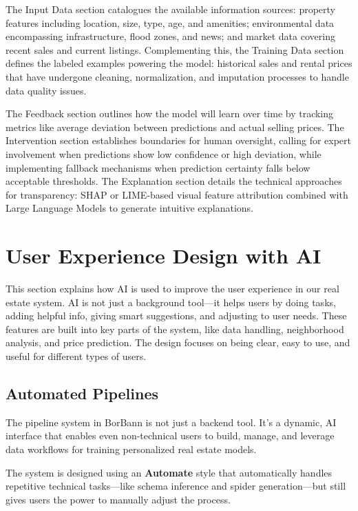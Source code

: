 The Input Data section catalogues the available information sources: property features including location, size, type, age, and amenities; environmental data encompassing infrastructure, flood zones, and news; and market data covering recent sales and current listings. Complementing this, the Training Data section defines the labeled examples powering the model: historical sales and rental prices that have undergone cleaning, normalization, and imputation processes to handle data quality issues.

The Feedback section outlines how the model will learn over time by tracking metrics like average deviation between predictions and actual selling prices. The Intervention section establishes boundaries for human oversight, calling for expert involvement when predictions show low confidence or high deviation, while implementing fallback mechanisms when prediction certainty falls below acceptable thresholds. The Explanation section details the technical approaches for transparency: SHAP or LIME-based visual feature attribution combined with Large Language Models to generate intuitive explanations.

\newpage


\newpage

\section{User Experience Design with AI}

This section explains how AI is used to improve the user experience in our real estate system. AI is not just a background tool—it helps users by doing tasks, adding helpful info, giving smart suggestions, and adjusting to user needs. These features are built into key parts of the system, like data handling, neighborhood analysis, and price prediction. The design focuses on being clear, easy to use, and useful for different types of users.

\subsection{Automated Pipelines}

The pipeline system in BorBann is not just a backend tool. It’s a dynamic, AI interface that enables even non-technical users to build, manage, and leverage data workflows for training personalized real estate models.

The system is designed using an \textbf{Automate} style that automatically handles repetitive technical tasks—like schema inference and spider generation—but still gives users the power to manually adjust the process.

